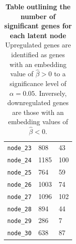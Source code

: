 \begin{table}[]
\begin{tabular}{|p{3cm}||p{4cm}|p{4cm}|}
        \texttt{node\_23} & 808 & 43 \\
        \texttt{node\_24} & 1185 & 100 \\
        \texttt{node\_25} & 764 & 59 \\
        \texttt{node\_26} & 1003 & 74 \\
        \texttt{node\_27} & 1096 & 102 \\
        \texttt{node\_28} & 894 & 44 \\
        \texttt{node\_29} & 286 & 7 \\
        \texttt{node\_30} & 638 & 87 \\
    \hline
    \end{tabular}
    \caption{\textbf{Table outlining the number of significant genes for each latent node} Upregulated genes are identified as genes with an embedding value of $\hat{\beta} > 0$ to a significance level of $\alpha = 0.05$. Inversely, downregulated genes are those with an embedding values of $\hat{\beta} < 0$. }
    \label{tab:sig_genes}
\end{table}

